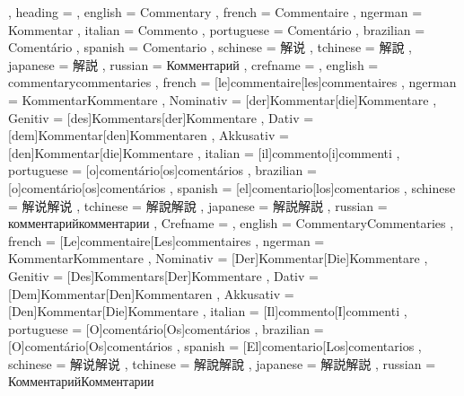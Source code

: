   {
    , heading =   {
                    , english     = Commentary
                    , french      = Commentaire
                    , ngerman     = Kommentar
                    , italian     = Commento
                    , portuguese  = Comentário
                    , brazilian   = Comentário
                    , spanish     = Comentario
                    , schinese    = 解说
                    , tchinese    = 解說
                    , japanese    = 解説 %
                    , russian     = Комментарий
                  }
    , crefname =  {
                    , english     = {commentary}{commentaries}
                    , french      = [le]{commentaire}[les]{commentaires}
                    , ngerman     = { {Kommentar}{Kommentare}
                                      , Nominativ = [der]{Kommentar}[die]{Kommentare}
                                      , Genitiv   = [des]{Kommentars}[der]{Kommentare}
                                      , Dativ     = [dem]{Kommentar}[den]{Kommentaren}
                                      , Akkusativ = [den]{Kommentar}[die]{Kommentare}
                                    }
                    , italian     = [il]{commento}[i]{commenti}
                    , portuguese  = [o]{comentário}[os]{comentários}
                    , brazilian   = [o]{comentário}[os]{comentários}
                    , spanish     = [el]{comentario}[los]{comentarios}
                    , schinese    = {解说}{解说}
                    , tchinese    = {解說}{解說}
                    , japanese    = {解説}{解説}
                    , russian     = {комментарий}{комментарии}
                  }
    , Crefname =  {
                    , english     = {Commentary}{Commentaries}
                    , french      = [Le]{commentaire}[Les]{commentaires}
                    , ngerman     = { {Kommentar}{Kommentare}
                                      , Nominativ = [Der]{Kommentar}[Die]{Kommentare}
                                      , Genitiv   = [Des]{Kommentars}[Der]{Kommentare}
                                      , Dativ     = [Dem]{Kommentar}[Den]{Kommentaren}
                                      , Akkusativ = [Den]{Kommentar}[Die]{Kommentare}
                                    }
                    , italian     = [Il]{commento}[I]{commenti}
                    , portuguese  = [O]{comentário}[Os]{comentários}
                    , brazilian   = [O]{comentário}[Os]{comentários}
                    , spanish     = [El]{comentario}[Los]{comentarios}
                    , schinese    = {解说}{解说}
                    , tchinese    = {解說}{解說}
                    , japanese    = {解説}{解説}
                    , russian     = {Комментарий}{Комментарии}
                  }
  }

